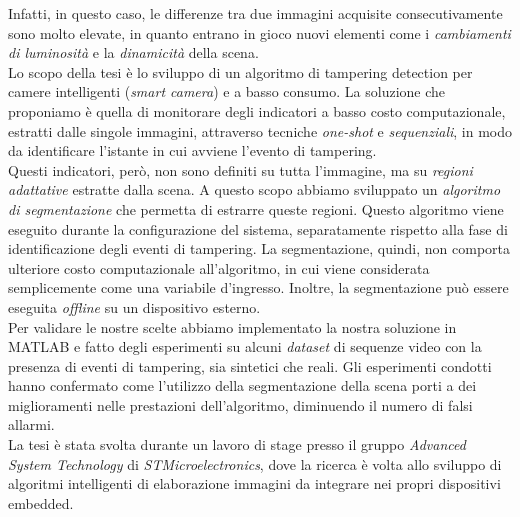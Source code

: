 Infatti, in questo caso, le differenze tra due immagini acquisite consecutivamente sono molto elevate, in quanto entrano in gioco nuovi elementi come i \textit{cambiamenti di luminosit\`a} e la \textit{dinamicit\`a} della scena.\\
Lo scopo della tesi \`e lo sviluppo di un algoritmo di tampering detection per camere intelligenti (\textit{smart camera}) e a basso consumo.
La soluzione che proponiamo \`e quella di monitorare degli indicatori a basso costo computazionale, estratti dalle singole immagini, attraverso tecniche \textit{one-shot} e \textit{sequenziali}, in modo da identificare l'istante in cui avviene l'evento di tampering.\\
Questi indicatori, per\`o, non sono definiti su tutta l'immagine, ma su \textit{regioni adattative} estratte dalla scena.
A questo scopo abbiamo sviluppato un \textit{algoritmo di segmentazione} che permetta di estrarre queste regioni.
Questo algoritmo viene eseguito durante la configurazione del sistema, separatamente rispetto alla fase di identificazione degli eventi di tampering.
La segmentazione, quindi, non comporta ulteriore costo computazionale all'algoritmo, in cui viene considerata semplicemente come una variabile d'ingresso.
Inoltre, la segmentazione pu\`o essere eseguita \textit{offline} su un dispositivo esterno.\\
Per validare le nostre scelte abbiamo implementato la nostra soluzione in MATLAB %
e fatto degli esperimenti su alcuni \textit{dataset} di sequenze video con la presenza di eventi di tampering, sia sintetici che reali.
Gli esperimenti condotti hanno confermato come l'utilizzo della segmentazione della scena porti a dei miglioramenti nelle prestazioni dell'algoritmo, diminuendo il numero di falsi allarmi.\\
La tesi \`e stata svolta durante un lavoro di stage presso il gruppo \textit{Advanced System Technology} di \textit{STMicroelectronics}, dove la ricerca \`e volta allo sviluppo di algoritmi intelligenti di elaborazione immagini da integrare nei propri dispositivi embedded.\\
